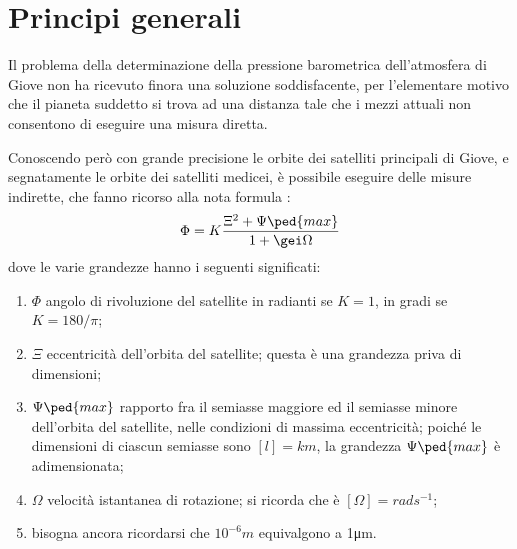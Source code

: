\documentclass[12pt,twoside,cucitura]{toptesi}
\begin{document}

\begin{frontespizio*}

\renewcommand{\Candidato}{Authors}
\author{
  LastName1, FirstName1\\
  LastName2, FirstName2\\
  LastName3, FirstName3\\
  LastName4, FirstName4\\
  LastName5, FirstName5\\
  LastName6, FirstName6\\
}

\end{frontespizio*}

\mainmatter

\section{Principi generali}
Il problema della determinazione della pressione barometrica dell'atmosfera di Giove non ha ricevuto finora una soluzione soddisfacente, per l'elementare motivo che il pianeta suddetto si trova ad una distanza tale che i mezzi attuali non consentono di eseguire una misura diretta.

Conoscendo però con grande precisione le orbite dei satelliti principali di Giove, e segnatamente le orbite dei satelliti medicei, è possibile eseguire delle misure indirette, che fanno ricorso alla nota formula \cite{gal}:
\[
\Phi = K\frac{\Xi^2 +\Psi\ped{max}}{1+\gei\Omega}
\]
dove le varie grandezze hanno i seguenti significati:
\begin{enumerate} %
\item
$\Phi$ angolo di rivoluzione del satellite in radianti se $K=1$, in gradi se $K=180/\pi$;
\item
$\Xi$ eccentricit\`a dell'orbita del satellite; questa \`e una grandezza priva di dimensioni;
\item
$\Psi\ped{max}$ rapporto fra il semiasse maggiore ed il semiasse minore dell'orbita del satellite, nelle condizioni di massima eccentricit\`a; poich\'e le dimensioni di ciascun semiasse sono $[l]=\unit{km}$, la grandezza $\Psi\ped{max}$ {\`e} adimensionata;
\item
$\Omega$ velocità istantanea di rotazione; si ricorda che è $[\Omega]=%
\unit{rad}\unit{s}^{-1}$;
\item bisogna ancora ricordarsi che $10^{-6}\unit{m}$ equivalgono a 1\unit{\micro m}.
\end{enumerate}
%
\end{document}
